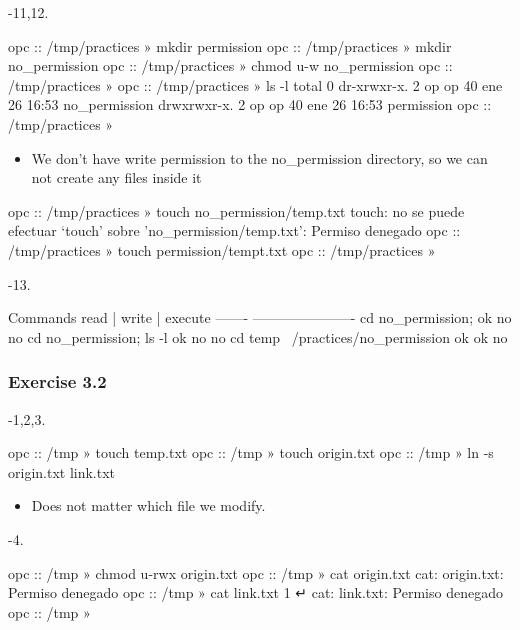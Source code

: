 \documentclass[a4paper]{article}
\begin{document}
{-\allowbreak}11,12.

\begin{plain}
opc :: /tmp/practices » mkdir permission
opc :: /tmp/practices » mkdir no_permission
opc :: /tmp/practices » chmod u-w no_permission
opc :: /tmp/practices » 
opc :: /tmp/practices » ls -l
total 0
dr-xrwxr-x. 2 op op 40 ene 26 16:53 no_permission
drwxrwxr-x. 2 op op 40 ene 26 16:53 permission
opc :: /tmp/practices » 
\end{plain}

\begin{itemize}
\item 
We don't have write permission to the no{\_\allowbreak}permission directory, so we can not create any files inside it
\end{itemize}

\begin{plain}
opc :: /tmp/practices » touch no_permission/temp.txt
touch: no se puede efectuar `touch' sobre 'no_permission/temp.txt': Permiso denegado
opc :: /tmp/practices » touch permission/tempt.txt                                                                      
opc :: /tmp/practices »
\end{plain}

{-\allowbreak}13.

\begin{plain}
Commands 				read | write | execute
------- 				----------------------
cd no_permission;			ok     no      no
cd no_permission; ls -l                 ok     no      no
cd temp ~/practices/no_permission       ok     ok      no
\end{plain}

\subsubsection{Exercise 3.2}

{-\allowbreak}1,2,3.

\begin{plain}
opc :: /tmp » touch temp.txt            
opc :: /tmp » touch origin.txt         
opc :: /tmp » ln -s origin.txt link.txt
\end{plain}

\begin{itemize}
\item 
Does not matter which file we modify.
\end{itemize}

{-\allowbreak}4. 

\begin{plain}
opc :: /tmp » chmod u-rwx origin.txt 
opc :: /tmp » cat origin.txt        
cat: origin.txt: Permiso denegado
opc :: /tmp » cat link.txt                                                                                              1 ↵
cat: link.txt: Permiso denegado
opc :: /tmp »    
\end{plain}
\end{document}
